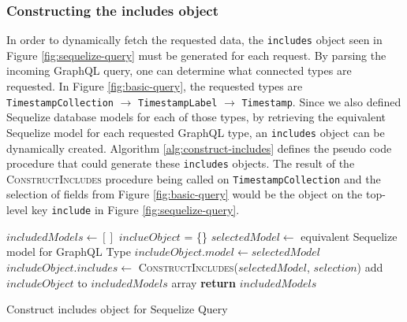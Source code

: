 \subsubsection{Constructing the includes object}
In order to dynamically fetch the requested data, the \verb!includes! object seen in Figure \ref{fig:sequelize-query} must be generated for each request.  By parsing the incoming GraphQL query, one can determine what connected types are requested.  In Figure \ref{fig:basic-query}, the requested types are \verb!TimestampCollection! $\rightarrow$ \verb!TimestampLabel! $\rightarrow$ \Verb!Timestamp!.  Since we also defined Sequelize database models for each of those types, by retrieving the equivalent Sequelize model for each requested GraphQL type, an \verb!includes! object can be dynamically created. Algorithm \ref{alg:construct-includes} defines the pseudo code procedure that could generate these \verb!includes! objects.  The result of the \textsc{ConstructIncludes} procedure being called on \Verb!TimestampCollection! and the selection of fields from Figure \ref{fig:basic-query} would be the object on the top-level key \verb!include! in Figure \ref{fig:sequelize-query}.

\begin{algorithm}[H]
    \begin{algorithmic}
            \State $includedModels \leftarrow []$
                \State $inclueObject$ = \{\}
                    \State $selectedModel \leftarrow$ equivalent Sequelize model for GraphQL Type
                    \State $includeObject.model \leftarrow selectedModel$
                    \State $includeObject.includes \leftarrow$ 
                    \State \textsc{  ConstructIncludes}($selectedModel$, $selection$)
                    \State add $includeObject$ to $includedModels$ array
                \EndIf
            \EndFor
            \State \textbf{return} $includedModels$
        \EndProcedure
    \end{algorithmic}
    \caption{Construct includes object for Sequelize Query}
    \label{alg:construct-includes}
\end{algorithm}